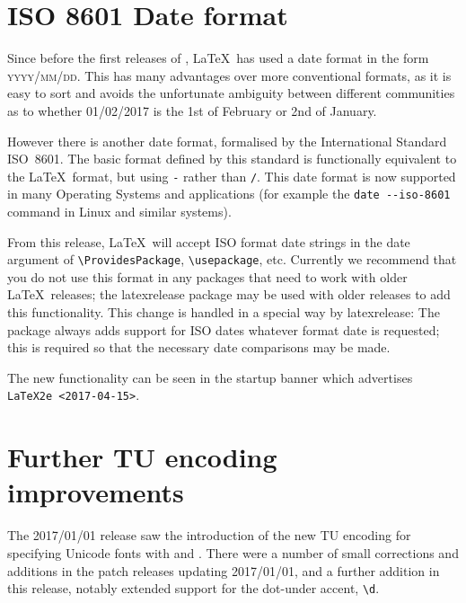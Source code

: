 \documentclass{ltnews}
\begin{document}
\maketitle
\tableofcontents

\setlength{}

\section{ISO 8601 Date format}
Since before the first releases of \LaTeXe, \LaTeX\ has used a date
format in the form \textsc{yyyy/mm/dd}. This has many advantages over more
conventional formats, as it is easy to sort and avoids the unfortunate
ambiguity between different communities as to whether 01/02/2017 is the
1st of February or 2nd of January.

However there is another date format, formalised by the
International Standard ISO~8601. The basic format defined by this
standard is functionally equivalent to the \LaTeX\ format, but using
\texttt{-} rather than \texttt{/}. This date format is now supported
in many Operating Systems and applications
(for example the \verb|date --iso-8601| command in Linux and similar systems).

From this release, \LaTeX\ will accept ISO format date strings in the
date argument of \verb|\ProvidesPackage|, \verb|\usepackage|, etc.
Currently we recommend that you do not use this format in any packages
that need to work with older \LaTeX\ releases; 
the \textsf{latexrelease} package may be used with older releases to
 add this functionality. This change is handled in a special way  by
 \textsf{latexrelease}: The package always adds support for ISO dates
whatever format date is requested; this is required so that the
necessary date comparisons may be made.

The new functionality can be seen in the startup banner which
advertises \texttt{LaTeX2e <2017-04-15>}.

\section{Further TU encoding improvements}
The 2017/01/01 release saw the introduction of the new TU encoding for
specifying Unicode fonts with  and
. There were a number of small corrections and additions
in the patch releases updating 2017/01/01, and a further addition in
this release, notably extended support for the dot-under accent,
\verb|\d|.
\end{document}
